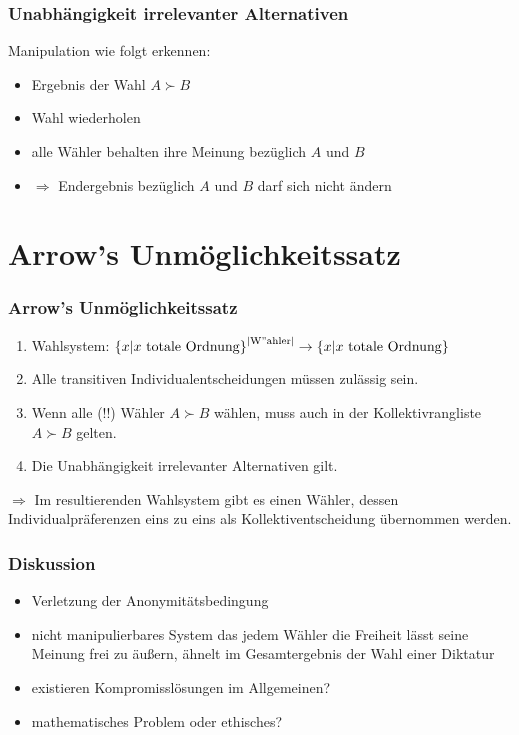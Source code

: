\documentclass{beamer}
\begin{document}
\begin{frame}[fragile]
	\frametitle{Unabhängigkeit irrelevanter Alternativen}
	Manipulation wie folgt erkennen:
	\begin{itemize}
		\item Ergebnis der Wahl $A \succ B$
		\item Wahl wiederholen
		\item alle Wähler behalten ihre Meinung bezüglich $A$ und $B$
		\pause
		\item $\Rightarrow$ Endergebnis bezüglich $A$ und $B$ darf sich nicht ändern
	\end{itemize}
\end{frame}


\section{Arrow's Unmöglichkeitssatz}
\begin{frame}[fragile]
	\frametitle{Arrow's Unmöglichkeitssatz}
	\begin{enumerate}
		\item \label{a-1} Wahlsystem: $ \left\{ x | x \ \mathrm{totale\ Ordnung} \right\} ^{|\mathrm{W"ahler}|} \rightarrow \left\{ x | x \ \mathrm{totale\ Ordnung} \right\}$
		\item \label{a-w-i} Alle transitiven Individualentscheidungen müssen zulässig sein.
		\item \label{a-3} Wenn alle (!!) Wähler $A \succ B$ wählen, muss auch in der Kollektivrangliste $A \succ B$ gelten.
		\item \label{a-4} Die Unabhängigkeit irrelevanter Alternativen gilt.
	\end{enumerate}
	\pause
	$\Rightarrow$ Im resultierenden Wahlsystem gibt es einen Wähler, dessen Individualpräferenzen eins zu eins als Kollektiventscheidung übernommen werden.
\end{frame}


\begin{frame}[fragile]
	\frametitle{Diskussion}
	\begin{itemize}
		\item Verletzung der Anonymitätsbedingung
		\pause
		\item nicht manipulierbares System das jedem Wähler die Freiheit lässt seine Meinung frei zu äußern, ähnelt im Gesamtergebnis der Wahl einer Diktatur
		\pause
		\item existieren Kompromisslösungen im Allgemeinen?
		\pause
		\item mathematisches Problem oder ethisches?
	\end{itemize}
\end{frame}
\end{document}

